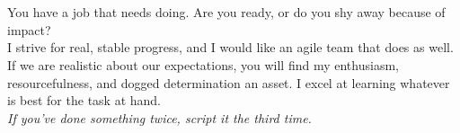 \noindent\begin{minipage}[l]{0.9\textwidth}
\noindent\\
\\
You have a job that needs doing. Are you ready, or do you shy away because of impact?\\
I strive for real, stable progress, and I would like an agile team that does as well.\\[5pt]
If we are realistic about our expectations, you will find my enthusiasm, resourcefulness, and dogged determination an asset. I excel at learning whatever is best for the task at hand.\\[5pt]
\textit{If you've done something twice, script it the third time.}
\end{minipage}
